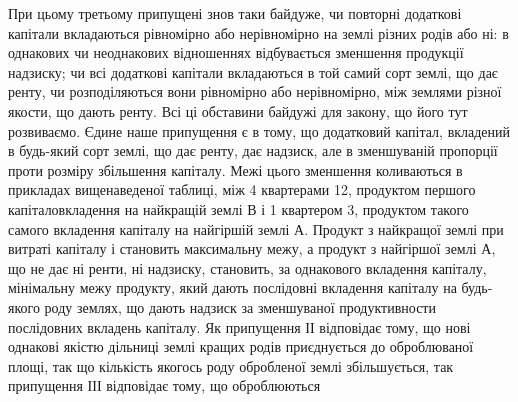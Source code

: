 \noindent{}При цьому третьому припущені знов таки байдуже, чи повторні додаткові
капітали вкладаються рівномірно або нерівномірно на землі різних родів або ні:
в однакових чи неоднакових відношеннях відбувається зменшення продукції
надзиску; чи всі додаткові капітали вкладаються в той самий сорт землі, що дає
ренту, чи розподіляються вони рівномірно або нерівномірно, між землями
різної якости, що дають ренту. Всі ці обставини байдужі для закону, що його тут
розвиваємо. Єдине наше припущення є в тому, що додатковий капітал,
вкладений в будь-який сорт землі, що дає ренту, дає надзиск, але в зменшуваній
пропорції проти розміру збільшення капіталу. Межі цього зменшення
коливаються в прикладах вищенаведеної таблиці, між 4 квартерами \deq{} 12,
продуктом першого капіталовкладення на найкращій землі $В$ і 1 квартером
\deq{} 3, продуктом такого самого вкладення капіталу на найгіршій
землі $А$. Продукт з найкращої землі при витраті капіталу і становить максимальну
межу, а продукт з найгіршої землі $А$, що не дає ні ренти, ні надзиску,
становить, за однакового вкладення капіталу, мінімальну межу продукту,
який дають послідовні вкладення капіталу на будь-якого роду землях, що дають надзиск за зменшуваної
продуктивности послідовних вкладень капіталу. Як
припущення ІІ відповідає тому, що нові однакові якістю дільниці землі кращих
родів приєднується до оброблюваної площі, так що кількість якогось роду обробленої
землі збільшується, так припущення ІІІ відповідає тому, що оброблюються
\parbreak{}  %
